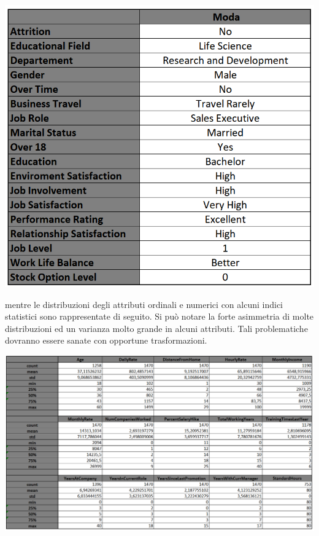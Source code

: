 \documentclass[english]{article}
\begin{document}
\begin{center}
\includegraphics[scale=1]{modacategoriciordinali.png}
\end{center}
 
 
mentre le distribuzioni degli attributi ordinali e numerici con alcuni indici statistici sono rappresentate di seguito.
Si può notare la forte asimmetria di molte distribuzioni ed un varianza molto grande in alcuni attributi. Tali problematiche dovranno essere sanate con opportune trasformazioni.

\begin{center}
\includegraphics[scale=1.1]{statistica.png}
\end{center}
\end{document}
